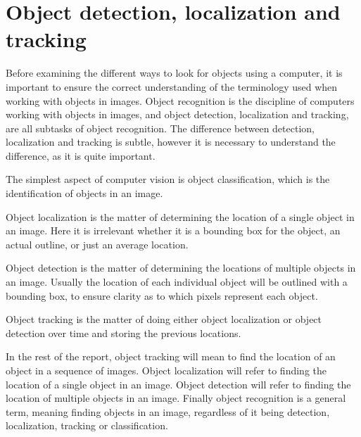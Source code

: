 \section{Object detection, localization and tracking}
Before examining the different ways to look for objects using a computer, it is important to ensure the correct understanding of the terminology used when working with objects in images.
Object recognition is the discipline of computers working with objects in images, and object detection, localization and tracking, are all subtasks of object recognition.
The difference between detection, localization and tracking is subtle, however it is necessary to understand the difference, as it is quite important\cite{objecttrackdetect}.

The simplest aspect of computer vision is object classification, which is the identification of objects in an image.

Object localization is the matter of determining the location of a single object in an image. 
Here it is irrelevant whether it is a bounding box for the object, an actual outline, or just an average location.

Object detection is the matter of determining the locations of multiple objects in an image.
Usually the location of each individual object will be outlined with a bounding box, to ensure clarity as to which pixels represent each object.

Object tracking is the matter of doing either object localization or object detection over time and storing the previous locations.

In the rest of the report, object tracking will mean to find the location of an object in a sequence of images.
Object localization will refer to finding the location of a single object in an image.
Object detection will refer to finding the location of multiple objects in an image.
Finally object recognition is a general term, meaning finding objects in an image, regardless of it being detection, localization, tracking or classification. 

